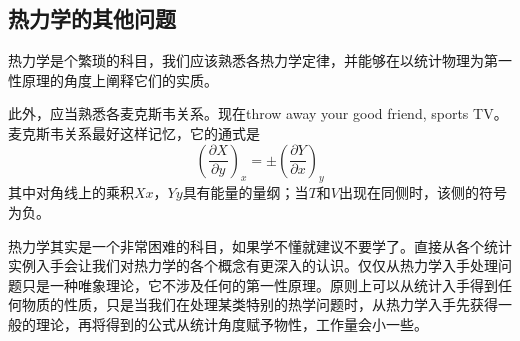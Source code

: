 \documentclass[a4paper,11pt]{ctexart}
\newcommand{\beq}{\begin{equation}}
\newcommand{\eeq}{\end{equation}}
\begin{document}
\subsection{热力学的其他问题}
热力学是个繁琐的科目，我们应该熟悉各热力学定律，并能够在以统计物理为第一性原理的角度上阐释它们的实质。
\par
此外，应当熟悉各麦克斯韦关系。现在throw away your good friend, sports TV。麦克斯韦关系最好这样记忆，它的通式是
\beq
(\frac{\partial X}{\partial y})_x = \pm (\frac{\partial Y}{\partial x})_y
\eeq
其中对角线上的乘积$Xx$，$Yy$具有能量的量纲；当$T$和$V$出现在同侧时，该侧的符号为负。
\par
热力学其实是一个非常困难的科目，如果学不懂就建议不要学了。直接从各个统计实例入手会让我们对热力学的各个概念有更深入的认识。仅仅从热力学入手处理问题只是一种唯象理论，它不涉及任何的第一性原理。原则上可以从统计入手得到任何物质的性质，只是当我们在处理某类特别的热学问题时，从热力学入手先获得一般的理论，再将得到的公式从统计角度赋予物性，工作量会小一些。
\end{document}
